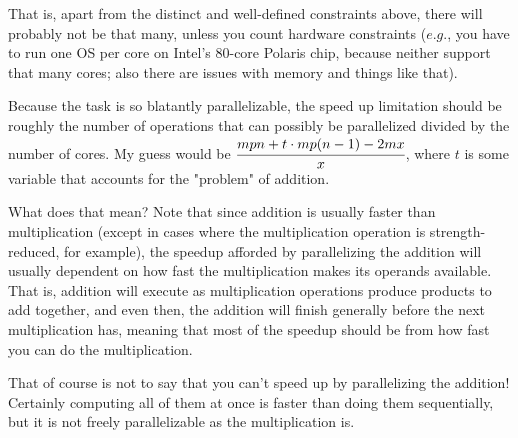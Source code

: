 \documentclass[a4paper]{article}
\begin{document}
That is, apart from the distinct and well-defined constraints above, there will probably not be that many, unless you count hardware constraints ($\textit{e.g.}$, you have to run one OS per core on Intel's 80-core Polaris chip, because neither support that many cores; also there are issues with memory and things like that).

Because the task is so blatantly parallelizable, the speed up limitation should be roughly the number of operations that can possibly be parallelized divided by the number of cores. My guess would be $\cfrac{mpn + t \cdot mp(n-1) - 2mx}{x}$, where $t$ is some variable that accounts for the "problem" of addition.

What does that mean? Note that since addition is usually faster than multiplication (except in cases where the multiplication operation is strength-reduced, for example), the speedup afforded by parallelizing the addition will usually dependent on how fast the multiplication makes its operands available. That is, addition will execute as multiplication operations produce products to add together, and even then, the addition will finish generally before the next multiplication has, meaning that most of the speedup should be from how fast you can do the multiplication.

That of course is not to say that you can't speed up by parallelizing the addition! Certainly computing all of them at once is faster than doing them sequentially, but it is not freely parallelizable as the multiplication is.
\end{document}
